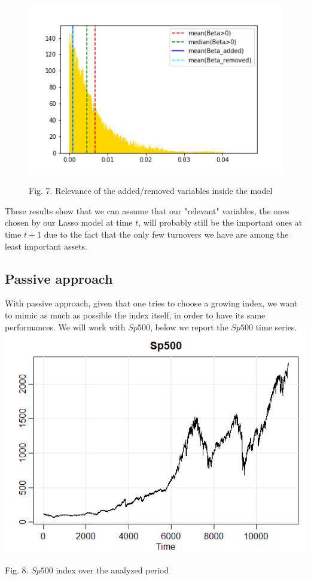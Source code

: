 \documentclass{article}%
\begin{document}
\begin{figure}[h!]
  \centering
  \includegraphics[scale=0.6]{turnover.png}
  \begin{center}
\begin{small}
Fig. 7. Relevance of the added/removed variables inside the model
\end{small}
\end{center}
  \label{turnover}
\end{figure}
These results show that we can assume that our "relevant" variables, the ones chosen by our Lasso model at time $t$, will probably still be the important ones at time $t+1$ due to the fact that the only few turnovers we have are among the least important assets.


\subsection{Passive approach}

With passive approach, given that one tries to choose a growing index, we want to mimic as much as possible the index itself, in order to have its same performances.
We will work with $Sp500$, below we report the $Sp500$ time series.
\\


\includegraphics[scale=0.75]{sp500}
\begin{center}
\begin{small}
Fig. 8. $Sp500$ index over the analyzed period
\\

\end{small}
\end{center}
\end{document}
